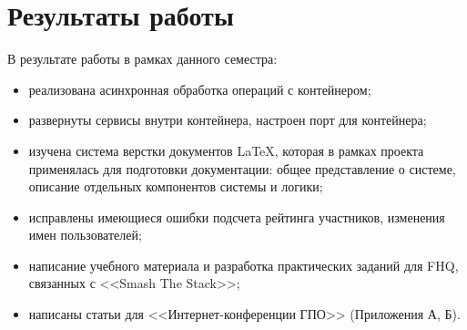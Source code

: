 \section{Результаты работы}

В результате работы в рамках данного семестра:
\begin{itemize}
\item реализована асинхронная обработка операций с контейнером;
\item развернуты сервисы внутри контейнера, настроен порт для контейнера;
\item изучена система верстки документов \LaTeX, которая в рамках проекта применялась для подготовки документации: общее представление о системе, описание отдельных компонентов системы и логики;
\item исправлены имеющиеся ошибки подсчета рейтинга участников, изменения имен пользователей;
\item написание учебного материала и разработка практических заданий для FHQ, связанных с <<Smash The Stack>>;
\item написаны статьи для <<Интернет-конференции ГПО>> (Приложения А, Б). 
\end{itemize}
\clearpage
